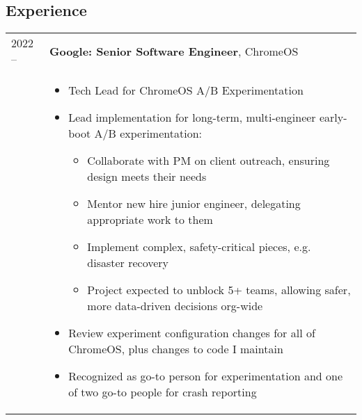 \documentclass[overlapped]{res}
\newcommand{\experience}[5]{
  \hspace{-9ex}
  \begin{tabular}{m{12ex} m{\textwidth}}
    #1 -- #2 & \textbf{#3}, #4 \\
    & #5
  \end{tabular}
  \vspace{-3ex}
}
\begin{document}

\address{
  \href{mailto:miriam@mutexlox.com}{miriam@mutexlox.com} \\
}
\address{  %
  \hfill \href{https://mutexlox.com}{https://mutexlox.com} \\
}

\begin{resume}


\section{Experience}
  \vspace{0.5ex}

  \experience{2022}{}{Google: Senior Software Engineer}{ChromeOS}{
    \begin{itemize} \itemsep -1pt
        \item Tech Lead for ChromeOS A/B Experimentation
        \item Lead implementation for long-term, multi-engineer early-boot
          A/B experimentation:
          \vspace{-0.5em}
          \begin{itemize} \itemsep -1pt
              \item Collaborate with PM on client outreach, ensuring
                design meets their needs
              \item Mentor new hire junior engineer, delegating appropriate
                work to them
              \item Implement complex, safety-critical pieces, e.g.
                disaster recovery
              \item Project expected to unblock 5+ teams, allowing safer, more
                data-driven decisions org-wide
          \end{itemize}
        \item Review experiment configuration changes for all of ChromeOS,
          plus changes to code I maintain
        \item Recognized as go-to person for experimentation and one of two
          go-to people for crash reporting
    \end{itemize}}


\end{resume}
\end{document}
